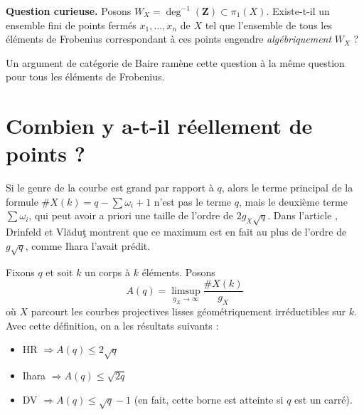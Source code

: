 \noindent
{\bf Question curieuse.}
Posons $W_X = \deg^{-1}(\mathbf{Z})\subset \pi_1(X)$.
Existe-t-il un ensemble fini de points fermés $x_1, \ldots, x_n$ de $X$ tel que
l'ensemble de tous les éléments de Frobenius correspondant à ces points
engendre {\it algébriquement} $W_X$ ?

\medskip\noindent
Un argument de catégorie de Baire ramène cette question à la même question
pour tous les éléments de Frobenius.





\section{Combien y a-t-il réellement de points ?}
\label{section-really}

\noindent
Si le genre de la courbe est grand par rapport à $q$, alors le terme
principal de la formule $\# X(k) = q - \sum \omega_i + 1$ n'est pas le terme $q$,
mais le deuxième terme $\sum \omega_i$, qui peut avoir a priori une
taille de l'ordre de $2g_X\sqrt{q}$. Dans l'article \cite{Drinfeld-number},
Drinfeld et Vlăduţ montrent que ce maximum est en fait au plus de l'ordre de
$g\sqrt{q}$, comme Ihara l'avait prédit.

\medskip\noindent
Fixons $q$ et soit $k$ un corps à $k$ éléments. Posons
$$
A(q) = \limsup_{g_X \to \infty} \frac{\# X(k)}{g_X}
$$
où $X$ parcourt les courbes projectives lisses géométriquement irréductibles
sur $k$. Avec cette définition, on a les résultats suivants :
\begin{itemize}
\item HR $\Rightarrow A(q)\leq 2\sqrt{q}$
\item Ihara $\Rightarrow A(q)\leq \sqrt{2q}$
\item DV $\Rightarrow A(q)\leq \sqrt{q}-1$ (en fait, cette borne est atteinte si $q$
est un carré).
\end{itemize}

